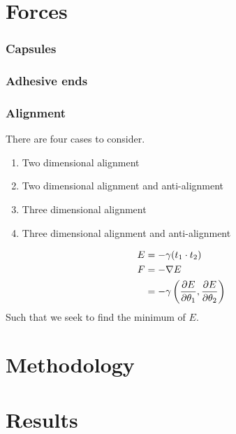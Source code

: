 \documentclass[journal, a4paper]{IEEEtran}
\begin{document}
\section{Forces}

\subsubsection{Capsules}
\subsubsection{Adhesive ends}
\subsubsection{Alignment}
There are four cases to consider.
\begin{enumerate}
    \item Two dimensional alignment
    \item Two dimensional alignment and anti-alignment
    \item Three dimensional alignment
    \item Three dimensional alignment and anti-alignment
\end{enumerate}
\begin{align}
    E   & = -\gamma (t_1\cdot t_2) \\
    F   & = -\nabla E \\
        & = -\gamma \left(\pdv{E}{\theta_1},\pdv{E}{\theta_2}\right)
\end{align}
Such that we seek to find the minimum of $E$.
\section{Methodology}
\section{Results}
\end{document}
